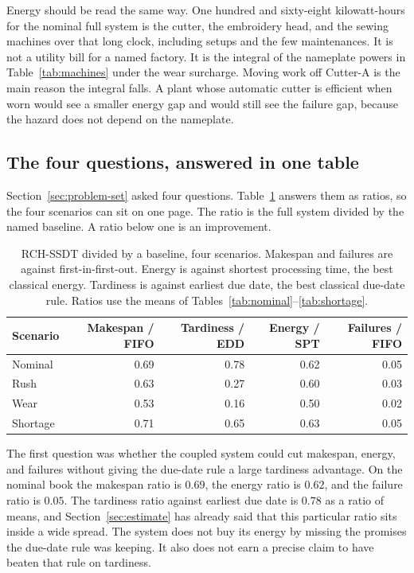 Energy should be read the same way. One hundred and sixty-eight kilowatt-hours for the nominal full system is the cutter, the embroidery head, and the sewing machines over that long clock, including setups and the few maintenances. It is not a utility bill for a named factory. It is the integral of the nameplate powers in Table~\ref{tab:machines} under the wear surcharge. Moving work off Cutter-A is the main reason the integral falls. A plant whose automatic cutter is efficient when worn would see a smaller energy gap and would still see the failure gap, because the hazard does not depend on the nameplate.

\subsection{The four questions, answered in one table}

Section~\ref{sec:problem-set} asked four questions. Table~\ref{tab:summary} answers them as ratios, so the four scenarios can sit on one page. The ratio is the full system divided by the named baseline. A ratio below one is an improvement.

\begin{table}[ht]
\centering
\caption{RCH-SSDT divided by a baseline, four scenarios. Makespan and failures are against first-in-first-out. Energy is against shortest processing time, the best classical energy. Tardiness is against earliest due date, the best classical due-date rule. Ratios use the means of Tables~\ref{tab:nominal}--\ref{tab:shortage}.}
\label{tab:summary}
\small
\begin{tabular}{lrrrr}
\toprule
Scenario & Makespan / FIFO & Tardiness / EDD & Energy / SPT & Failures / FIFO \\
\midrule
Nominal & 0.69 & 0.78 & 0.62 & 0.05 \\
Rush & 0.63 & 0.27 & 0.60 & 0.03 \\
Wear & 0.53 & 0.16 & 0.50 & 0.02 \\
Shortage & 0.71 & 0.65 & 0.63 & 0.05 \\
\bottomrule
\end{tabular}
\end{table}

The first question was whether the coupled system could cut makespan, energy, and failures without giving the due-date rule a large tardiness advantage. On the nominal book the makespan ratio is \(0.69\), the energy ratio is \(0.62\), and the failure ratio is \(0.05\). The tardiness ratio against earliest due date is \(0.78\) as a ratio of means, and Section~\ref{sec:estimate} has already said that this particular ratio sits inside a wide spread. The system does not buy its energy by missing the promises the due-date rule was keeping. It also does not earn a precise claim to have beaten that rule on tardiness.

